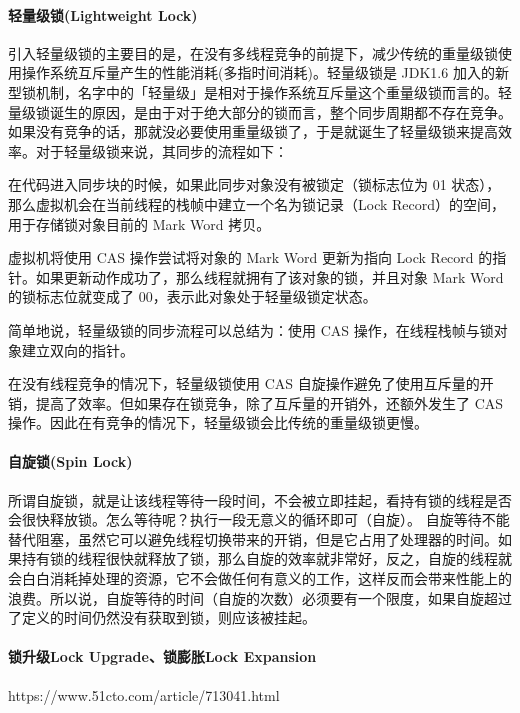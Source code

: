 \documentclass[../../../interview-questions.tex]{subfiles}
\begin{document}
\paragraph{轻量级锁(Lightweight Lock)}
引入轻量级锁的主要目的是，在没有多线程竞争的前提下，减少传统的重量级锁使用操作系统互斥量产生的性能消耗(多指时间消耗)。轻量级锁是 JDK1.6 加入的新型锁机制，名字中的「轻量级」是相对于操作系统互斥量这个重量级锁而言的。轻量级锁诞生的原因，是由于对于绝大部分的锁而言，整个同步周期都不存在竞争。如果没有竞争的话，那就没必要使用重量级锁了，于是就诞生了轻量级锁来提高效率。对于轻量级锁来说，其同步的流程如下：

在代码进入同步块的时候，如果此同步对象没有被锁定（锁标志位为 01 状态），那么虚拟机会在当前线程的栈帧中建立一个名为锁记录（Lock Record）的空间，用于存储锁对象目前的 Mark Word 拷贝。

虚拟机将使用 CAS 操作尝试将对象的 Mark Word 更新为指向 Lock Record 的指针。如果更新动作成功了，那么线程就拥有了该对象的锁，并且对象 Mark Word 的锁标志位就变成了 00，表示此对象处于轻量级锁定状态。

简单地说，轻量级锁的同步流程可以总结为：使用 CAS 操作，在线程栈帧与锁对象建立双向的指针。

在没有线程竞争的情况下，轻量级锁使用 CAS 自旋操作避免了使用互斥量的开销，提高了效率。但如果存在锁竞争，除了互斥量的开销外，还额外发生了 CAS 操作。因此在有竞争的情况下，轻量级锁会比传统的重量级锁更慢。

\paragraph{自旋锁(Spin Lock)}所谓自旋锁，就是让该线程等待一段时间，不会被立即挂起，看持有锁的线程是否会很快释放锁。怎么等待呢？执行一段无意义的循环即可（自旋）。
自旋等待不能替代阻塞，虽然它可以避免线程切换带来的开销，但是它占用了处理器的时间。如果持有锁的线程很快就释放了锁，那么自旋的效率就非常好，反之，自旋的线程就会白白消耗掉处理的资源，它不会做任何有意义的工作，这样反而会带来性能上的浪费。所以说，自旋等待的时间（自旋的次数）必须要有一个限度，如果自旋超过了定义的时间仍然没有获取到锁，则应该被挂起。

\paragraph{锁升级Lock Upgrade、锁膨胀Lock Expansion}

https://www.51cto.com/article/713041.html
\end{document}
